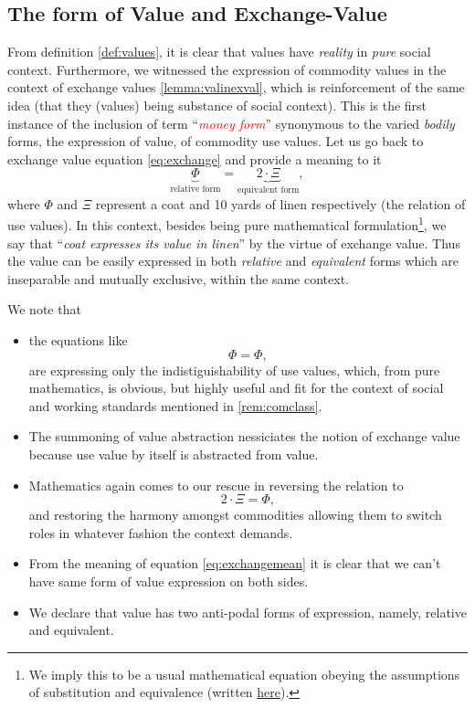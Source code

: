 \documentclass[12pt]{extarticle}
\theoremstyle{definition}
\newenvironment{remark}[1][Remark]{\begin{trivlist}
\item[\hskip \labelsep {\bfseries #1}]}{\end{trivlist}}
\begin{document}
\subsection{The form of Value and Exchange-Value}
From definition \ref{def:values}, it is clear that values have \emph{reality} in \emph{pure} social context.  Furthermore, we witnessed the expression of commodity values in the context of exchange values \ref{lemma:valinexval}, which is reinforcement of the same idea (that they (values) being substance of social context).  This is the first instance of the inclusion of term ``\emph{\textcolor{red}{money form}}'' synonymous to the varied \emph{bodily} forms, the expression of value, of commodity use values.  Let us go back to exchange value equation \ref{eq:exchange} and provide a meaning to it
\begin{equation}
  \label{eq:exchangemean}
  \underbrace{\Phi}_{\text{relative form}} = \underbrace{2\cdot\Xi}_{\text{equivalent form}},
\end{equation}
where $\Phi$ and $\Xi$ represent a coat and 10 yards of linen respectively (the relation of use values).  In this context, besides being pure mathematical formulation\footnote{We imply this to be a usual mathematical equation obeying the assumptions of substitution and equivalence (written \href{https://en.wikipedia.org/wiki/Equality_(mathematics)\#Basic_properties}{here}).}, we say that ``\emph{coat expresses its value in linen}'' by the virtue of exchange value.  Thus the value can be easily expressed in both \emph{relative} and \emph{equivalent} forms which are inseparable and mutually exclusive, within the same context.

\begin{remark}
  We note that
  \begin{itemize}
\item the equations like
\begin{equation}
  \label{eq:tuto}
  \Phi = \Phi,
\end{equation}
are expressing only the indistiguishability of use values, which, from pure mathematics, is obvious, but highly useful and fit for the context of social and working standards mentioned in \ref{rem:comclass}.
\item The summoning of value abstraction nessiciates the notion of exchange value because use value by itself is abstracted from value.
\item Mathematics again comes to our rescue in reversing the relation to
  \begin{equation}
    2\cdot\Xi = \Phi,
  \end{equation}
  and restoring the harmony amongst commodities allowing them to switch roles in whatever fashion the context demands.
  \item From the meaning of equation \ref{eq:exchangemean} it is clear that we can't have same form of value expression on both sides.
  \item We declare that value has two anti-podal forms of expression, namely, relative and equivalent.
\end{itemize}
\end{remark}
\end{document}
